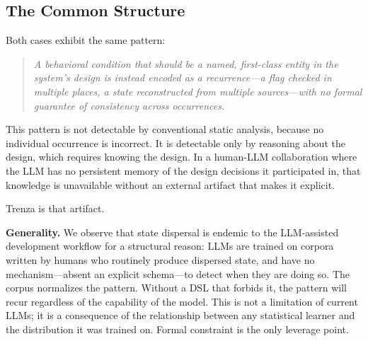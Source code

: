 \subsection{The Common Structure}
\label{sec:pattern}

Both cases exhibit the same pattern:

\begin{quote}
\itshape
A behavioral condition that should be a named, first-class entity in the
system's design is instead encoded as a recurrence---a flag checked in multiple
places, a state reconstructed from multiple sources---with no formal guarantee
of consistency across occurrences.
\end{quote}

This pattern is not detectable by conventional static analysis, because no
individual occurrence is incorrect. It is detectable only by reasoning about
the design, which requires knowing the design. In a human-LLM collaboration
where the LLM has no persistent memory of the design decisions it participated
in, that knowledge is unavailable without an external artifact that makes it
explicit.

Trenza is that artifact.

\medskip

\noindent\textbf{Generality.}
We observe that state dispersal is endemic to the LLM-assisted development
workflow for a structural reason: LLMs are trained on corpora written by humans
who routinely produce dispersed state, and have no mechanism---absent an
explicit schema---to detect when they are doing so. The corpus normalizes the
pattern. Without a DSL that forbids it, the pattern will recur regardless of
the capability of the model. This is not a limitation of current LLMs; it is a
consequence of the relationship between any statistical learner and the
distribution it was trained on. Formal constraint is the only leverage point.
